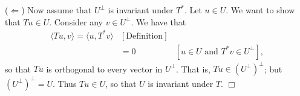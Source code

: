 \documentclass[9pt]{article}
\newcommand{\qed}{\hfill \ensuremath{\Box}}
\newcommand{\cyc}[1]{\langle #1 \rangle}
\begin{document}
\begin{enumerate}
      ($\Leftarrow$) Now assume that $U^\perp$ is invariant under $T^*$. Let
      $u \in U$. We want to show that $Tu \in U$. Consider any $v \in U^\perp$.
      We have that
      \begin{align*}
         \cyc{Tu, v} = \cyc{u, T^*v} &[\text{Definition}] \\
          &= 0 &[u \in U \text{ and } T^*v \in U^\perp],
      \end{align*}
      so that $Tu$ is orthogonal to every vector in $U^\perp$. That is,
      $Tu \in (U^\perp)^\perp$; but $(U^\perp)^\perp = U$. Thus $Tu \in U$, so
      that $U$ is invariant under $T$. \qed
      
\end{enumerate}
\end{document}
